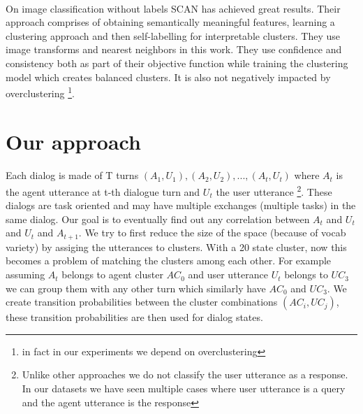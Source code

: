 \documentclass{article}
\begin{document}
\paragraph{}
On image classification without labels SCAN \cite{vangansbeke2020scan} has achieved great results. Their approach comprises of obtaining semantically meaningful features, learning a clustering approach and then self-labelling for interpretable clusters. They use image transforms and nearest neighbors in this work. They use confidence and consistency both as part of their objective function while training the clustering model which creates balanced clusters. It is also not negatively impacted by overclustering \footnote{in fact in our experiments we depend on overclustering}. 


\section{Our approach}
\paragraph{}
Each dialog is made of T turns  $(A_1, U_1), (A_2, U_2), ..., (A_t, U_t)$ where $A_t$ is the agent utterance at t-th dialogue turn and $U_t$ the user utterance \footnote{Unlike other approaches we do not classify the user utterance as a response. In our datasets we have seen multiple cases where user utterance is a query and the agent utterance is the response}. These dialogs are task oriented  and may have multiple exchanges (multiple tasks) in the same dialog. Our goal is to eventually find out any correlation between $A_t$ and $U_t$ and $U_t$ and $A_{t+1}$. We try to first reduce the size of the space (because of vocab variety) by assiging the utterances to clusters. With a 20 state cluster, now this becomes a problem of matching the clusters among each other. For example assuming $A_t$ belongs to agent cluster $AC_0$ and user utterance $U_t$ belongs to $UC_3$ we can group them with any other turn which similarly have $AC_0$ and $UC_3$. We create transition probabilities between the cluster combinations $(AC_i, UC_j)$, these transition probabilities are then used for dialog states.
\end{document}
